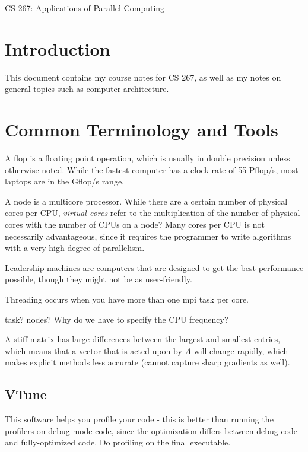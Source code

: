 \documentclass[10pt]{article}
\begin{document}
\begin{centering}
\Large CS 267: Applications of Parallel Computing\\
\end{centering}

\tableofcontents
\clearpage

\section{Introduction}
\begin{flushleft}\justify

This document contains my course notes for CS 267, as well as my notes on general topics such as computer architecture.

\section{Common Terminology and Tools}

A flop is a floating point operation, which is usually in double precision unless otherwise noted. While the fastest computer has a clock rate of 55 Pflop/s, most laptops are in the Gflop/s range. 

A node is a multicore processor. While there are a certain number of physical cores per CPU, \textit{virtual cores} refer to the multiplication of the number of physical cores with the number of CPUs on a node? Many cores per CPU is not necessarily advantageous, since it requires the programmer to write algorithms with a very high degree of parallelism.

Leadership machines are computers that are designed to get the best performance possible, though they might not be as user-friendly.

Threading occurs when you have more than one \gls{mpi} task per core. 

task? 
nodes?
Why do we have to specify the CPU frequency?

A stiff matrix has large differences between the largest and smallest entries, which means that a vector that is acted upon by \(A\) will change rapidly, which makes explicit methods less accurate (cannot capture sharp gradients as well). 

\subsection{VTune}

This software helps you profile your code - this is better than running the profilers on debug-mode code, since the optimization differs between debug code and fully-optimized code. Do profiling on the final executable.


\end{flushleft}
\end{document}
